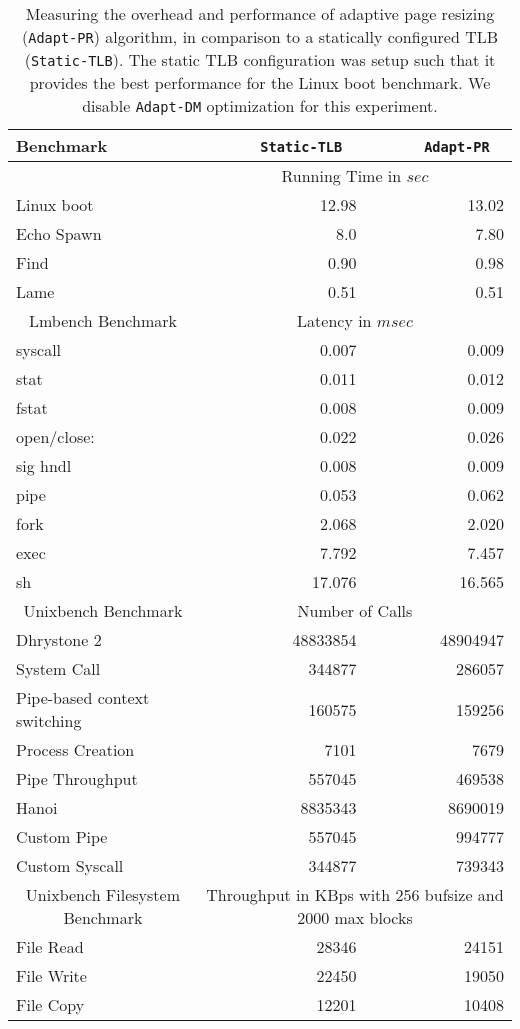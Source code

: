 \begin{table*}
\centering
      \begin{tabular}{|p{2.0cm}| r r |} \hline
        Benchmark\verb, ,& {\tt Static-TLB} \verb, ,& {\tt Adapt-PR} \verb, , \\ \hline

     & \multicolumn{2}{c|}{Running Time in $sec$}\\ \cline {2-3}
Linux boot	&	12.98	&	13.02\\
Echo Spawn	&	8.0	&	7.80\\
Find	&	0.90	&	0.98\\
Lame	&	0.51	&	0.51\\
\cline{1-3}
\multicolumn{1}{|c|}{Lmbench Benchmark}     & \multicolumn{2}{c|}{Latency in $msec$}\\  \cline{1-3}
syscall	&	0.007	&	0.009\\
stat	 &	0.011	&	0.012\\
fstat	&	0.008	&	0.009\\
open/close:	&	0.022	&	0.026\\
sig hndl	&	0.008	&	0.009\\
pipe 	&	0.053	&	0.062\\
fork	&	2.068	&	2.020\\
exec	&	7.792	&	7.457\\
sh	&	17.076	&	16.565\\
\cline{1-3}
\multicolumn{1}{|c|}{Unixbench Benchmark}     & \multicolumn{2}{c|}{Number of Calls}\\  \cline{1-3}
Dhrystone 2	&	48833854	&	48904947\\
System Call	&	344877	&	286057\\
Pipe-based context switching	&	160575	&	159256\\
Process Creation	&	7101	&	7679\\
Pipe Throughput	&	557045	&	469538\\
Hanoi	&	8835343	&	8690019\\
Custom Pipe	&	557045	&	994777\\
Custom Syscall	&	344877	&	739343\\
\cline{1-3}
\multicolumn{1}{|c|}{Unixbench Filesystem Benchmark}     & \multicolumn{2}{c|}{Throughput in KBps with 256 bufsize and 2000 max blocks
}\\  \cline{1-3}
File Read	&	28346	&	24151\\
File Write	&	22450	&	19050\\
File Copy	&	12201	&	10408\\
 \hline
      \end{tabular}
\caption{\label{tab:adaptive_tlb_resizing}Measuring the overhead and performance of adaptive page resizing ({\tt Adapt-PR}) algorithm, in comparison to
a statically configured TLB ({\tt Static-TLB}). The static TLB configuration was setup such that it provides the best performance for the Linux boot benchmark. We disable {\tt Adapt-DM} optimization for this experiment.}
\end{table*} 

